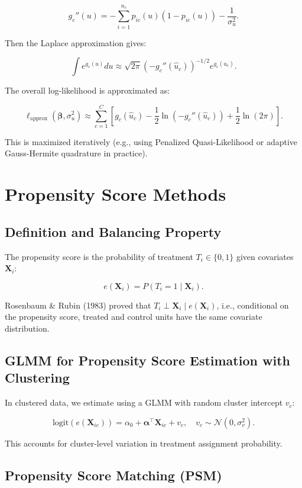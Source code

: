 \documentclass[12pt]{article}
\begin{document}
	\[
	g_c''(u) = -\sum_{i=1}^{n_c} p_{ic}(u)(1-p_{ic}(u)) - \frac{1}{\sigma_u^2}.
	\]
	
	Then the Laplace approximation gives:
	
	\[
	\int e^{g_c(u)} du \approx \sqrt{2\pi} \left(-g_c''(\hat{u}_c)\right)^{-1/2} e^{g_c(\hat{u}_c)}.
	\]
	
	The overall log-likelihood is approximated as:
	
	\[
	\ell_{\text{approx}}(\boldsymbol{\beta}, \sigma_u^2) \approx \sum_{c=1}^C \left[ g_c(\hat{u}_c) - \frac{1}{2} \ln\left(-g_c''(\hat{u}_c)\right) + \frac{1}{2} \ln(2\pi) \right].
	\]
	
	This is maximized iteratively (e.g., using Penalized Quasi-Likelihood or adaptive Gauss-Hermite quadrature in practice).
	
	\section{Propensity Score Methods}
	
	\subsection{Definition and Balancing Property}
	
	The propensity score is the probability of treatment $T_i \in \{0,1\}$ given covariates $\mathbf{X}_i$:
	
	\[
	e(\mathbf{X}_i) = P(T_i = 1 \mid \mathbf{X}_i).
	\]
	
	Rosenbaum \& Rubin (1983) proved that $T_i \perp \mathbf{X}_i \mid e(\mathbf{X}_i)$, i.e., conditional on the propensity score, treated and control units have the same covariate distribution.
	
	\subsection{GLMM for Propensity Score Estimation with Clustering}
	
	In clustered data, we estimate using a GLMM with random cluster intercept $v_c$:
	
	\[
	\text{logit}(e(\mathbf{X}_{ic})) = \alpha_0 + \boldsymbol{\alpha}^\top \mathbf{X}_{ic} + v_c, \quad v_c \sim \mathcal{N}(0, \sigma_v^2).
	\]
	
	This accounts for cluster-level variation in treatment assignment probability.
	
	\subsection{Propensity Score Matching (PSM)}
	
\end{document}
